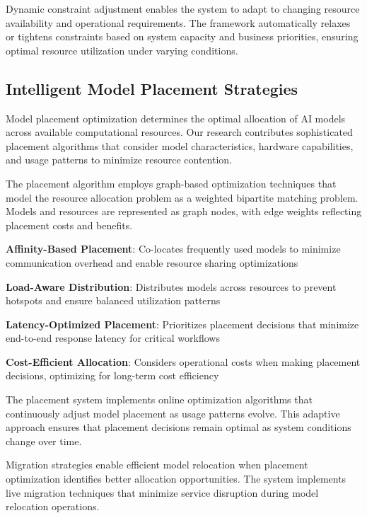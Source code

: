Dynamic constraint adjustment enables the system to adapt to changing resource availability and operational requirements. The framework automatically relaxes or tightens constraints based on system capacity and business priorities, ensuring optimal resource utilization under varying conditions.

\subsection*{Intelligent Model Placement Strategies}

Model placement optimization determines the optimal allocation of AI models across available computational resources. Our research contributes sophisticated placement algorithms that consider model characteristics, hardware capabilities, and usage patterns to minimize resource contention.

The placement algorithm employs graph-based optimization techniques that model the resource allocation problem as a weighted bipartite matching problem. Models and resources are represented as graph nodes, with edge weights reflecting placement costs and benefits.

\begin{expandedlist}
    \item \textbf{Affinity-Based Placement}: Co-locates frequently used models to minimize communication overhead and enable resource sharing optimizations
    \item \textbf{Load-Aware Distribution}: Distributes models across resources to prevent hotspots and ensure balanced utilization patterns
    \item \textbf{Latency-Optimized Placement}: Prioritizes placement decisions that minimize end-to-end response latency for critical workflows
    \item \textbf{Cost-Efficient Allocation}: Considers operational costs when making placement decisions, optimizing for long-term cost efficiency
\end{expandedlist}

The placement system implements online optimization algorithms that continuously adjust model placement as usage patterns evolve. This adaptive approach ensures that placement decisions remain optimal as system conditions change over time.

Migration strategies enable efficient model relocation when placement optimization identifies better allocation opportunities. The system implements live migration techniques that minimize service disruption during model relocation operations.

